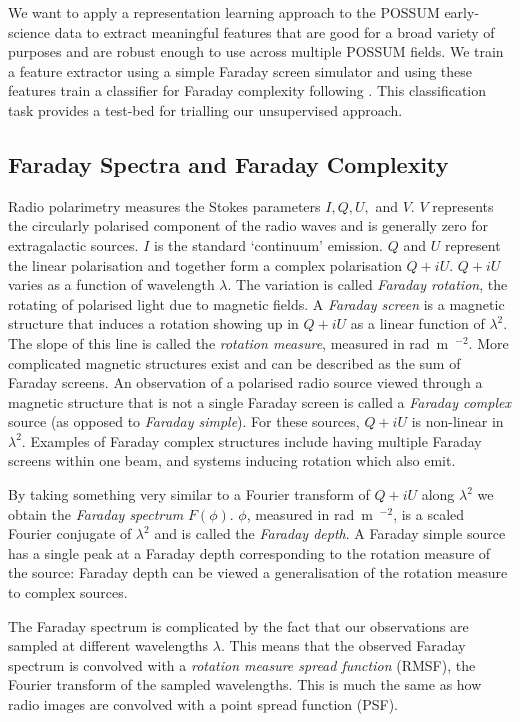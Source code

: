 \documentclass[a4paper]{article}
\newcommand{\defn}[1]{\emph{#1}}
\begin{document}
        We want to apply a representation learning approach to the POSSUM early-science data to extract meaningful features that are good for a broad variety of purposes and are robust enough to use across multiple POSSUM fields. We train a feature extractor using a simple Faraday screen simulator and using these features train a classifier for Faraday complexity following \citet{brown19complexity}. This classification task provides a test-bed for trialling our unsupervised approach.

        \subsection{Faraday Spectra and Faraday Complexity}

            Radio polarimetry measures the Stokes parameters $I, Q, U,$ and $V$. $V$ represents the circularly polarised component of the radio waves and is generally zero for extragalactic sources. $I$ is the standard `continuum' emission. $Q$ and $U$ represent the linear polarisation and together form a complex polarisation $Q + iU$. $Q + iU$ varies as a function of wavelength $\lambda$. The variation is called \defn{Faraday rotation}, the rotating of polarised light due to magnetic fields. A \defn{Faraday screen} is a magnetic structure that induces a rotation showing up in $Q + iU$ as a linear function of $\lambda^2$. The slope of this line is called the \defn{rotation measure}, measured in rad~m~$^{-2}$. More complicated magnetic structures exist and can be described as the sum of Faraday screens. An observation of a polarised radio source viewed through a magnetic structure that is not a single Faraday screen is called a \defn{Faraday complex} source (as opposed to \defn{Faraday simple}). For these sources, $Q + iU$ is non-linear in $\lambda^2$. Examples of Faraday complex structures include having multiple Faraday screens within one beam, and systems inducing rotation which also emit.

            By taking something very similar to a Fourier transform of $Q + iU$ along $\lambda^2$ we obtain the \defn{Faraday spectrum} $F(\phi)$. $\phi$, measured in rad~m~$^{-2}$, is a scaled Fourier conjugate of $\lambda^2$ and is called the \defn{Faraday depth}. A Faraday simple source has a single peak at a Faraday depth corresponding to the rotation measure of the source: Faraday depth can be viewed a generalisation of the rotation measure to complex sources.

            The Faraday spectrum is complicated by the fact that our observations are sampled at different wavelengths $\lambda$. This means that the observed Faraday spectrum is convolved with a \defn{rotation measure spread function} (RMSF), the Fourier transform of the sampled wavelengths. This is much the same as how radio images are convolved with a point spread function (PSF).
\end{document}
